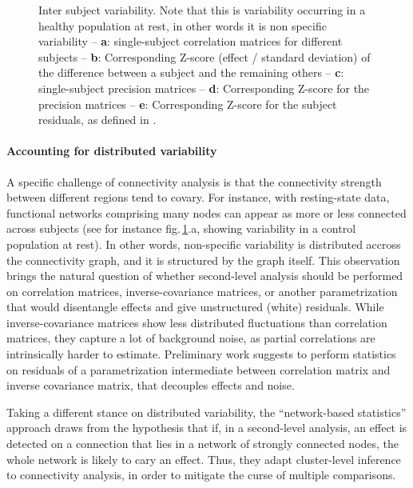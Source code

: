 \documentclass[5p]{elsarticle}
\begin{document}
\begin{figure}
\caption{Inter subject variability. Note that this is variability
occurring in a healthy population at rest, in other words it is non specific
variability -- \textbf{a}: single-subject
correlation matrices for different subjects -- \textbf{b}:
Corresponding Z-score (effect / standard deviation) of the difference
between a subject and the remaining others -- \textbf{c}:
single-subject precision matrices -- \textbf{d}: Corresponding Z-score
for the precision matrices -- \textbf{e}:
Corresponding Z-score for the subject residuals, as defined in 
\cite{varoquaux2010b}.
\label{fig:inter_subject}}
\end{figure}

\paragraph{Accounting for distributed variability}
%
A specific challenge of connectivity analysis is that the connectivity
strength between different regions tend to covary. For instance, with
resting-state data, functional networks comprising many nodes can appear
as more or less connected across subjects (see for instance
fig.\,\ref{fig:inter_subject}.a, showing variability in a control
population at rest). In other words, non-specific variability is
distributed accross the connectivity graph, and it is structured by the
graph itself. This observation brings the natural question of whether
second-level analysis should be performed on correlation matrices,
inverse-covariance matrices, or another parametrization that would
disentangle effects and give unstructured (white) residuals. While
inverse-covariance matrices show less distributed fluctuations than
correlation matrices, they capture a lot of background noise, as partial
correlations are intrinsically harder to estimate. Preliminary work
\cite{varoquaux2010b} suggests to perform statistics on residuals of
a parametrization intermediate between correlation matrix and inverse
covariance matrix, that decouples effects and noise.

Taking a different stance on distributed variability, the ``network-based
statistics'' approach \cite{zalesky2010} draws from the hypothesis that
if, in a second-level analysis, an effect is detected on a connection
that lies in a network of strongly connected nodes, the whole network is
likely to cary an effect. Thus, they adapt cluster-level inference to
connectivity analysis, in order to mitigate the curse of multiple
comparisons.
\end{document}
